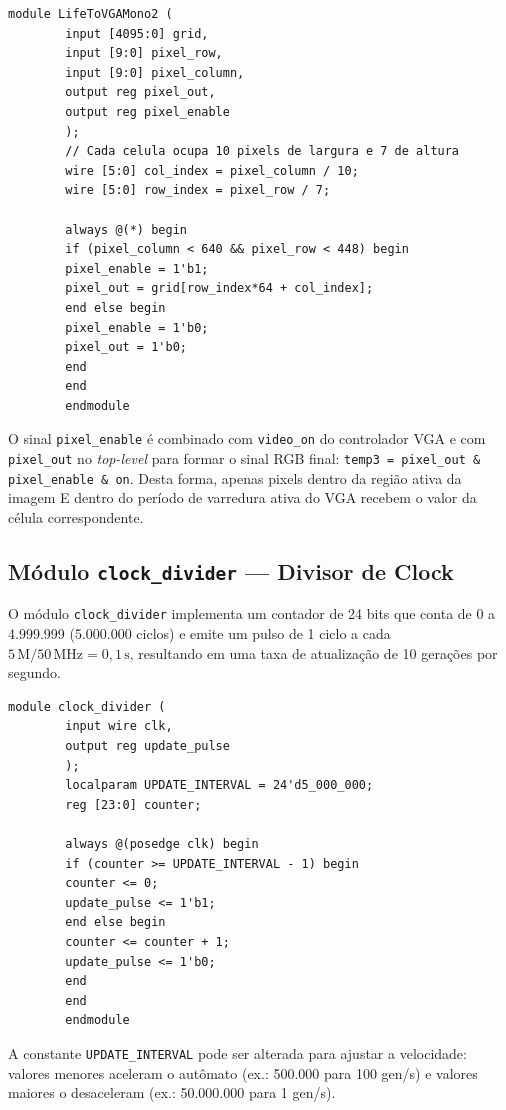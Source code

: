 \documentclass[12pt, a4paper]{article}
\begin{document}
	\begin{lstlisting}[style=verilog, caption={\texttt{LifeToVGAMono2.v} --- Mapeamento combinacional da grade 64$\times$64 para o quadro VGA 640$\times$480.}, label={lst:lifetovga}]
		module LifeToVGAMono2 (
		input [4095:0] grid,
		input [9:0] pixel_row,
		input [9:0] pixel_column,
		output reg pixel_out,
		output reg pixel_enable
		);
		// Cada celula ocupa 10 pixels de largura e 7 de altura
		wire [5:0] col_index = pixel_column / 10;
		wire [5:0] row_index = pixel_row / 7;
		
		always @(*) begin
		if (pixel_column < 640 && pixel_row < 448) begin
		pixel_enable = 1'b1;
		pixel_out = grid[row_index*64 + col_index];
		end else begin
		pixel_enable = 1'b0;
		pixel_out = 1'b0;
		end
		end
		endmodule
	\end{lstlisting}
	
	O sinal \texttt{pixel\_enable} é combinado com \texttt{video\_on} do controlador
	VGA e com \texttt{pixel\_out} no \textit{top-level} para formar o sinal RGB
	final: \texttt{temp3 = pixel\_out \& pixel\_enable \& on}. Desta forma, apenas
	pixels dentro da região ativa da imagem E dentro do período de varredura ativa
	do VGA recebem o valor da célula correspondente.
	
	\subsection{Módulo \texttt{clock\_divider} --- Divisor de Clock}
	
	O módulo \texttt{clock\_divider} implementa um contador de 24 bits que conta
	de 0 a 4.999.999 (5.000.000 ciclos) e emite um pulso de 1 ciclo a cada
	$5\,\text{M} / 50\,\text{MHz} = 0{,}1\,\text{s}$, resultando em uma taxa de
	atualização de 10 gerações por segundo.
	
	\begin{lstlisting}[style=verilog, caption={\texttt{clock\_divider.v} --- Divisor de clock para controle de velocidade de evolução do autômato.}, label={lst:clockdiv}]
		module clock_divider (
		input wire clk,
		output reg update_pulse
		);
		localparam UPDATE_INTERVAL = 24'd5_000_000;
		reg [23:0] counter;
		
		always @(posedge clk) begin
		if (counter >= UPDATE_INTERVAL - 1) begin
		counter <= 0;
		update_pulse <= 1'b1;
		end else begin
		counter <= counter + 1;
		update_pulse <= 1'b0;
		end
		end
		endmodule
	\end{lstlisting}
	
	A constante \texttt{UPDATE\_INTERVAL} pode ser alterada para ajustar a velocidade:
	valores menores aceleram o autômato (ex.: 500.000 para 100 gen/s) e valores
	maiores o desaceleram (ex.: 50.000.000 para 1 gen/s).
	
\end{document}

